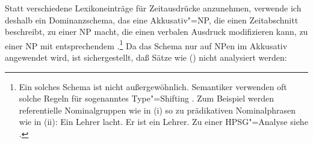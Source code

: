 Statt verschiedene Lexikoneinträge für Zeitausdrücke anzunehmen, verwende ich deshalb ein
Dominanzschema, das eine Akkusativ"=NP, die einen Zeitabschnitt beschreibt, zu einer NP macht, die
einen verbalen Ausdruck modifizieren kann, \dash zu einer NP mit entsprechendem \modw.\footnote{
  Ein solches Schema ist nicht außergewöhnlich. Semantiker verwenden oft solche Regeln für
  sogenanntes \mbox{Type}"=Shifting \citep{Partee86b-u}. Zum Beispiel werden referentielle Nominalgruppen
  wie in (i) so zu prädikativen Nominalphrasen wie in (ii):
  \eal
  \ex Ein Lehrer lacht.
  \ex Er ist ein Lehrer.
  \zl
  Zu einer HPSG"=Analyse siehe .
} Da das Schema
nur auf NPen im Akkusativ angewendet wird, ist sichergestellt, daß Sätze wie () nicht
analysiert werden: 
\eal 
{}
\zl
